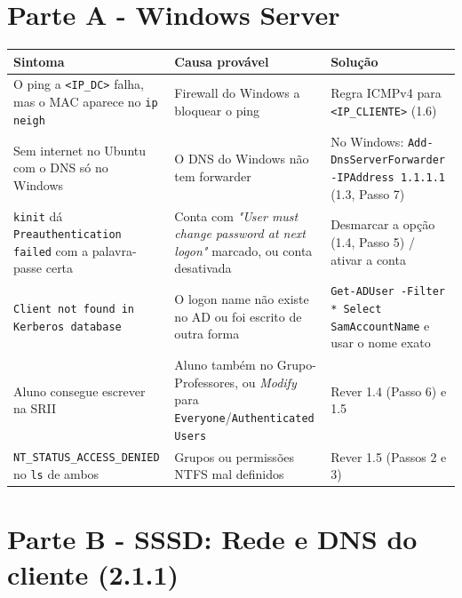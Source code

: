 \documentclass[11pt,a4paper,oneside]{report}
\begin{document}
\label{ec-a}

\section*{Parte A - Windows Server}

\begin{center}\small
\begin{tabularx}{\linewidth}{|>{\raggedright\arraybackslash}X|>{\raggedright\arraybackslash}X|>{\raggedright\arraybackslash}X|}
\hline
\rowcolor{azul!10}\textbf{Sintoma} & \textbf{Causa provável} & \textbf{Solução} \\
\hline
O ping a \texttt{\textless{}IP\_DC\textgreater{}} falha, mas o MAC aparece no \texttt{ip neigh} & Firewall do Windows a bloquear o ping & Regra ICMPv4 para \texttt{\textless{}IP\_CLIENTE\textgreater{}} (1.6) \\
\hline
Sem internet no Ubuntu com o DNS só no Windows & O DNS do Windows não tem forwarder & No Windows: \texttt{Add-DnsServerForwarder -IPAddress 1.1.1.1} (1.3, Passo 7) \\
\hline
\texttt{kinit} dá \texttt{Preauthentication failed} com a palavra-passe certa & Conta com \emph{"User must change password at next logon"} marcado, ou conta desativada & Desmarcar a opção (1.4, Passo 5) / ativar a conta \\
\hline
\texttt{Client not found in Kerberos database} & O logon name não existe no AD ou foi escrito de outra forma & \texttt{Get-ADUser -Filter * \textbar{} Select SamAccountName} e usar o nome exato \\
\hline
Aluno consegue escrever na SRII & Aluno também no Grupo-Professores, ou \emph{Modify} para \texttt{Everyone}/\texttt{Authenticated Users} & Rever 1.4 (Passo 6) e 1.5 \\
\hline
\texttt{NT\_STATUS\_ACCESS\_DENIED} no \texttt{ls} de ambos & Grupos ou permissões NTFS mal definidos & Rever 1.5 (Passos 2 e 3) \\
\hline
\end{tabularx}
\end{center}

\label{ec-b1-rede}

\section*{Parte B - SSSD: Rede e DNS do cliente (2.1.1)}
\end{document}

